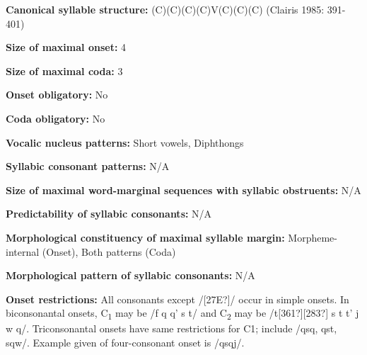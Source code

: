 \begin{styleBody}
\textbf{Canonical syllable structure:} (C)(C)(C)(C)V(C)(C)(C)\textbf{ }(Clairis 1985: 391-401)
\end{styleBody}

\begin{styleBody}
\textbf{Size of maximal onset:} 4
\end{styleBody}

\begin{styleBody}
\textbf{Size of maximal coda:} 3
\end{styleBody}

\begin{styleBody}
\textbf{Onset obligatory:} No
\end{styleBody}

\begin{styleBody}
\textbf{Coda obligatory:} No
\end{styleBody}

\begin{styleBody}
\textbf{Vocalic nucleus patterns:} Short vowels, Diphthongs
\end{styleBody}

\begin{styleBody}
\textbf{Syllabic consonant patterns:} N/A
\end{styleBody}

\begin{styleBody}
\textbf{Size of maximal word{}-marginal sequences with syllabic obstruents:} N/A
\end{styleBody}

\begin{styleBody}
\textbf{Predictability of syllabic consonants:} N/A 
\end{styleBody}

\begin{styleBody}
\textbf{Morphological constituency of maximal syllable margin:} Morpheme-internal (Onset), Both patterns (Coda)
\end{styleBody}

\begin{styleBody}
\textbf{Morphological pattern of syllabic consonants:} N/A
\end{styleBody}

\begin{styleBody}
\textbf{Onset restrictions: }All consonants except /[27E?]/ occur in simple onsets. In biconsonantal onsets, C\textsubscript{1} may be /f q q' s t/ and C\textsubscript{2} may be /t[361?][283?] s t t' j w q/. Triconsonantal onsets have same restrictions for C1; include /qsq, qst, sqw/. Example given of four-consonant onset is /qsqj/.
\end{styleBody}

